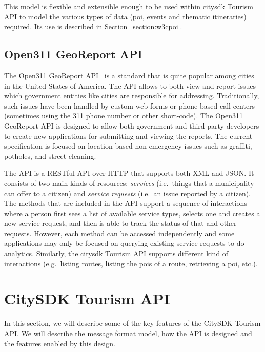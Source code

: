 \documentclass[times,doublespace]{ettauth}%
\begin{document}
This model is flexible and extensible enough to be used within \ac{citysdk} Tourism API to model the various types of data (\ac{poi}, events and thematic itineraries) required.
Its use is described in Section~\ref{section:w3cpoi}.

\subsection{Open311 GeoReport API}
The Open311 GeoReport API~\cite{open311} is a standard that is quite popular among cities in the United States of America.
The API allows to both view and report issues which government entities like cities are responsible for addressing.
Traditionally, such issues have been handled by custom web forms or phone based call centers (sometimes using the 311 phone number or other short-code).
The Open311 GeoReport API is designed to allow both government and third party developers to create new applications for submitting and viewing the reports.
The current specification is focused on location-based non-emergency issues such as graffiti, potholes, and street cleaning.

The API is a RESTful API over HTTP that supports both XML and JSON\@.
It consists of two main kinds of resources: \emph{services} (i.e.\  things that a municipality can offer to a citizen) and \emph{service requests} (i.e.\  an issue reported by a citizen).
The methods that are included in the API support a sequence of interactions where a person first sees a list of available service types, selects one and creates a new service request, and then is able to track the status of that and other requests.
However, each method can be accessed independently and some applications may only be focused on querying existing service requests to do analytics.
Similarly, the \ac{citysdk} Tourism API supports different kind of interactions (e.g.\  listing routes, listing the \acp{poi} of a route, retrieving a \ac{poi}, etc.).


\section{CitySDK Tourism API}
\label{s:tourim-api}
In this section, we will describe some of the key features of the CitySDK Tourism API\@. We will describe the message format model, how the API is designed and the features enabled by this design.
\end{document}
